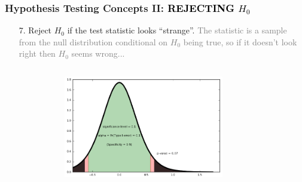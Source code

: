\documentclass[xcolor={dvipsnames}]{beamer}
\begin{document}
\frame
{
 \frametitle{Hypothesis Testing Concepts II: \textcolor{black}{\textbf{REJECTING} $H_0$}}

 \vspace{-1em}
 
\begin{enumerate}
\item[7.] Reject $H_0$ if the test statistic \textcolor{NavyBlue}{looks ``strange''}. \textcolor{gray}{The statistic is a sample from the null distribution conditional on $H_0$ being true, so if it doesn't look right then $H_0$ seems wrong...}
\end{enumerate}

 \vspace{-2.5em}

 \vspace{-.025in}
 
\begin{columns}
\begin{column}{.185\textwidth}
\end{column}
\begin{column}{.615\textwidth}
  
 \begin{figure}
\centering
\hspace*{-.4em}\includegraphics[width=2.75in]{stuff/tests_2.png}
\end{figure}

\vspace{-.3925in}
\end{column}
\begin{column}{.2\textwidth}

\end{column}
\end{columns}

 \vspace{1em}

\color{Maroon}

\vspace{-.5em}


}
\end{document}
